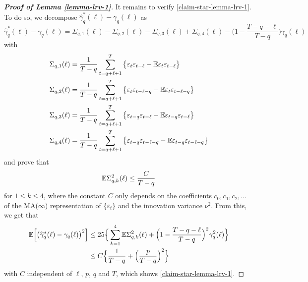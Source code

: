 \begin{proof}[\textnormal{\textbf{Proof of Lemma \ref{lemma-lrv-1}}}]
It remains to verify \eqref{claim-star-lemma-lrv-1}. To do so, we decompose $\widehat{\gamma}_q^*(\ell) - \gamma_q(\ell)$ as 
\[ \widehat{\gamma}_q^*(\ell) - \gamma_q(\ell) = \Sigma_{q,1}(\ell) - \Sigma_{q,2}(\ell) - \Sigma_{q,3}(\ell) + \Sigma_{q,4}(\ell) - \Big(1 - \frac{T-q-\ell}{T-q}\Big) \gamma_q(\ell) \]
with
\begin{align*}
\Sigma_{q,1}(\ell) & = \frac{1}{T-q} \sum_{t=q+\ell+1}^T \big\{ \varepsilon_t \varepsilon_{t-\ell} - \mathbb{E} \varepsilon_t \varepsilon_{t-\ell} \big\} \\
\Sigma_{q,2}(\ell) & = \frac{1}{T-q} \sum_{t=q+\ell+1}^T \big\{ \varepsilon_t \varepsilon_{t-\ell-q} - \mathbb{E} \varepsilon_t \varepsilon_{t-\ell-q} \big\} \\
\Sigma_{q,3}(\ell) & = \frac{1}{T-q} \sum_{t=q+\ell+1}^T \big\{ \varepsilon_{t-q} \varepsilon_{t-\ell} - \mathbb{E} \varepsilon_{t-q} \varepsilon_{t-\ell} \big\} \\
\Sigma_{q,4}(\ell) & = \frac{1}{T-q} \sum_{t=q+\ell+1}^T \big\{ \varepsilon_{t-q} \varepsilon_{t-\ell-q} - \mathbb{E} \varepsilon_{t-q} \varepsilon_{t-\ell-q} \big\} 
\end{align*}
and prove that 
\begin{equation}\label{eq1-star-lemma-lrv-1}
\mathbb{E} \Sigma_{q,k}^2(\ell) \le \frac{C}{T-q} 
\end{equation}
for $1 \le k \le 4$, where the constant $C$ only depends on the coefficients $c_0,c_1,c_2,\ldots$ of the MA($\infty$) representation of $\{\varepsilon_t\}$ and the innovation variance $\nu^2$. From this, we get that 
\begin{align*}
\mathbb{E} \Big[ \big( \widehat{\gamma}_q^*(\ell) - \gamma_q(\ell) \big)^2 \Big] 
 & \le 25 \Big\{ \sum_{k=1}^4 \mathbb{E} \Sigma_{q,k}^2(\ell) + \Big(1 - \frac{T-q-\ell}{T-q}\Big)^2 \gamma_q^2(\ell) \Big\} \\
 & \le C \Big\{ \frac{1}{T-q} + \Big(\frac{p}{T-q}\Big)^2 \Big\} 
\end{align*}
with $C$ independent of $\ell$, $p$, $q$ and $T$, which shows \eqref{claim-star-lemma-lrv-1}. 



\end{proof}

